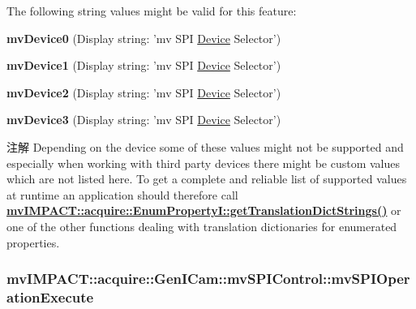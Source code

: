 The following string values might be valid for this feature\+:
\begin{DoxyItemize}
\item {\bfseries mv\+Device0} (Display string\+: 'mv S\+P\+I \hyperlink{classmv_i_m_p_a_c_t_1_1acquire_1_1_device}{Device} Selector')
\item {\bfseries mv\+Device1} (Display string\+: 'mv S\+P\+I \hyperlink{classmv_i_m_p_a_c_t_1_1acquire_1_1_device}{Device} Selector')
\item {\bfseries mv\+Device2} (Display string\+: 'mv S\+P\+I \hyperlink{classmv_i_m_p_a_c_t_1_1acquire_1_1_device}{Device} Selector')
\item {\bfseries mv\+Device3} (Display string\+: 'mv S\+P\+I \hyperlink{classmv_i_m_p_a_c_t_1_1acquire_1_1_device}{Device} Selector')
\end{DoxyItemize}

\begin{DoxyNote}{注解}
Depending on the device some of these values might not be supported and especially when working with third party devices there might be custom values which are not listed here. To get a complete and reliable list of supported values at runtime an application should therefore call {\bfseries \hyperlink{classmv_i_m_p_a_c_t_1_1acquire_1_1_enum_property_i_a0ba6ccbf5ee69784d5d0b537924d26b6}{mv\+I\+M\+P\+A\+C\+T\+::acquire\+::\+Enum\+Property\+I\+::get\+Translation\+Dict\+Strings()}} or one of the other functions dealing with translation dictionaries for enumerated properties. 
\end{DoxyNote}
\hypertarget{classmv_i_m_p_a_c_t_1_1acquire_1_1_gen_i_cam_1_1mv_s_p_i_control_ad30bb2d3142e194403bc35755ee10f5c}{
\subsubsection[{mv\+S\+P\+I\+Operation\+Execute}]{ mv\+I\+M\+P\+A\+C\+T\+::acquire\+::\+Gen\+I\+Cam\+::mv\+S\+P\+I\+Control\+::mv\+S\+P\+I\+Operation\+Execute}}\label{classmv_i_m_p_a_c_t_1_1acquire_1_1_gen_i_cam_1_1mv_s_p_i_control_ad30bb2d3142e194403bc35755ee10f5c}


